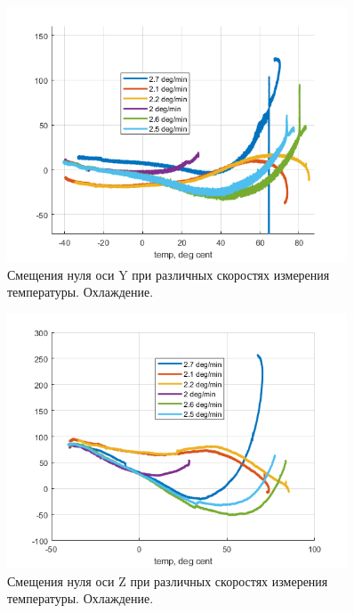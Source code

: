 \documentclass[a4paper,12pt]{article}
\begin{document}
\begin{figure}[h]
\centering
\includegraphics[width=0.9\textwidth]{continius_wy_down.png} 
\caption{\label{fig:continius_wy_down}Смещения нуля оси Y при различных скоростях измерения температуры. Охлаждение.}
\end{figure}
\begin{figure}[h]
\centering
\includegraphics[width=0.9\textwidth]{continius_wz_down.png} 
\caption{\label{fig:continius_wz_down}Смещения нуля оси Z при различных скоростях измерения температуры. Охлаждение.}
\end{figure}

\end{document}
